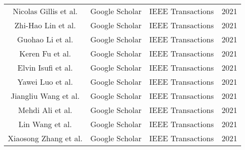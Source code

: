 \begin{center}
\begin{tabular}{cccc}
Nicolas Gillis et al. \cite{nicolasgillis2021} & Google Scholar & IEEE Transactions & 2021 \\
Zhi-Hao Lin et al. \cite{zhihaolin2021} & Google Scholar & IEEE Transactions & 2021 \\
Guohao Li et al. \cite{guohaoli2021} & Google Scholar & IEEE Transactions & 2021 \\
Keren Fu et al. \cite{kerenfu2021} & Google Scholar & IEEE Transactions & 2021 \\
Elvin Isufi et al. \cite{elvinisufi2021} & Google Scholar & IEEE Transactions & 2021 \\
Yawei Luo et al. \cite{yaweiluo2021} & Google Scholar & IEEE Transactions & 2021 \\
Jiangliu Wang et al. \cite{jiangliuwang2021} & Google Scholar & IEEE Transactions & 2021 \\
Mehdi Ali et al. \cite{mehdiali2021} & Google Scholar & IEEE Transactions & 2021 \\
Lin Wang et al. \cite{linwang2021} & Google Scholar & IEEE Transactions & 2021 \\
Xiaosong Zhang et al. \cite{xiaosongzhangfangwan2021} & Google Scholar & IEEE Transactions & 2021 \\
\hline
\end{tabular}
\end{center}


